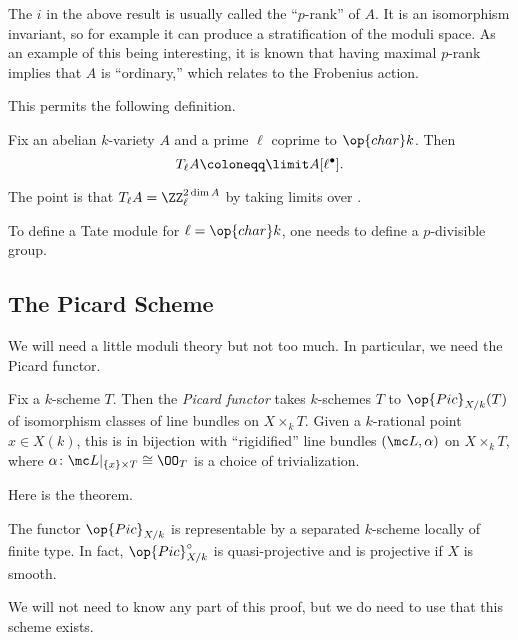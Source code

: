 \documentclass[../notes.tex]{subfiles}
\begin{document}
\begin{remark}
	The $i$ in the above result is usually called the ``$p$-rank'' of $A$. It is an isomorphism invariant, so for example it can produce a stratification of the moduli space. As an example of this being interesting, it is known that having maximal $p$-rank implies that $A$ is ``ordinary,'' which relates to the Frobenius action.
\end{remark}
This permits the following definition.
\begin{definition}
	Fix an abelian $k$-variety $A$ and a prime $\ell$ coprime to $\op{char}k$. Then
	\[T_\ell A\coloneqq\limit A[\ell^\bullet].\]
\end{definition}
The point is that $T_\ell A=\ZZ_\ell^{2\dim A}$ by taking limits over .
\begin{remark}
	To define a Tate module for $\ell=\op{char}k$, one needs to define a $p$-divisible group.
\end{remark}

\subsection{The Picard Scheme}
We will need a little moduli theory but not too much. In particular, we need the Picard functor.
\begin{definition}[Picard]
	Fix a $k$-scheme $T$. Then the \textit{Picard functor} takes $k$-schemes $T$ to $\op{Pic}_{X/k}(T)$ of isomorphism classes of line bundles on $X\times_kT$. Given a $k$-rational point $x\in X(k)$, this is in bijection with ``rigidified'' line bundles $(\mc L,\alpha)$ on $X\times_kT$, where $\alpha\colon\mc L|_{\{x\}\times T}\cong\OO_T$ is a choice of trivialization.
\end{definition}
Here is the theorem.
\begin{theorem}[Grothendieck]
	The functor $\op{Pic}_{X/k}$ is representable by a separated $k$-scheme locally of finite type. In fact, $\op{Pic}^\circ_{X/k}$ is quasi-projective and is projective if $X$ is smooth.
\end{theorem}
We will not need to know any part of this proof, but we do need to use that this scheme exists.
\end{document}
